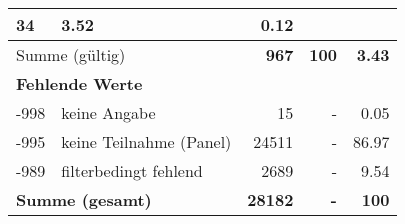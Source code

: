 \begin{longtable}{lXrrr}
       \num{34} &
       \num[round-mode=places,round-precision=2]{3.52} &
         \num[round-mode=places,round-precision=2]{0.12} \\
     \midrule
     \multicolumn{2}{l}{Summe (gültig)} &
       \textbf{\num{967}} &
     \textbf{100} &
       \textbf{\num[round-mode=places,round-precision=2]{3.43}} \\
     \multicolumn{5}{l}{\textbf{Fehlende Werte}}\\
       -998 &
       keine Angabe &
         \num{15} &
        - &
         \num[round-mode=places,round-precision=2]{0.05} \\
       -995 &
       keine Teilnahme (Panel) &
         \num{24511} &
        - &
         \num[round-mode=places,round-precision=2]{86.97} \\
       -989 &
       filterbedingt fehlend &
         \num{2689} &
        - &
         \num[round-mode=places,round-precision=2]{9.54} \\
     \midrule
     \multicolumn{2}{l}{\textbf{Summe (gesamt)}} &
          \textbf{\num{28182}} &
        \textbf{-} &
        \textbf{100} \\
     \bottomrule
     \end{longtable}
     
